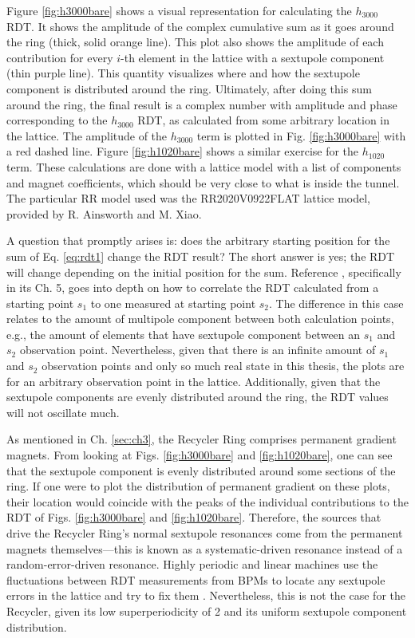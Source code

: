 Figure \ref{fig:h3000bare} shows a visual representation for calculating the $h_{3000}$ RDT. It shows the amplitude of the complex cumulative sum as it goes around the ring (thick, solid orange line). This plot also shows the amplitude of each contribution for every $i$-th element in the lattice with a sextupole component (thin purple line). This quantity visualizes where and how the sextupole component is distributed around the ring. Ultimately, after doing this sum around the ring, the final result is a complex number with amplitude and phase corresponding to the $h_{3000}$ RDT, as calculated from some arbitrary location in the lattice. The amplitude of the $h_{3000}$ term is plotted in Fig. \ref{fig:h3000bare} with a red dashed line. Figure \ref{fig:h1020bare} shows a similar exercise for the $h_{1020}$ term. These calculations are done with a lattice model with a list of components and magnet coefficients, which should be very close to what is inside the tunnel. The particular RR model used was the RR2020V0922FLAT lattice model, provided by R. Ainsworth and M. Xiao.

A question that promptly arises is: does the arbitrary starting position for the sum of Eq. \ref{eq:rdt1} change the RDT result? The short answer is yes; the RDT will change depending on the initial position for the sum. Reference \cite{cernthesis2}, specifically in its Ch. 5, goes into depth on how to correlate the RDT calculated from a starting point $s_1$ to one measured at starting point $s_2$. The difference in this case relates to the amount of multipole component between both calculation points, e.g., the amount of elements that have sextupole component between an $s_1$ and $s_2$ observation point. Nevertheless, given that there is an infinite amount of $s_1$ and $s_2$ observation points and only so much real state in this thesis, the plots are for an arbitrary observation point in the lattice. Additionally, given that the sextupole components are evenly distributed around the ring, the RDT values will not oscillate much.

As mentioned in Ch. \ref{sec:ch3}, the Recycler Ring comprises permanent gradient magnets. From looking at Figs. \ref{fig:h3000bare} and \ref{fig:h1020bare}, one can see that the sextupole component is evenly distributed around some sections of the ring. If one were to plot the distribution of permanent gradient on these plots, their location would coincide with the peaks of the individual contributions to the RDT of Figs. \ref{fig:h3000bare} and \ref{fig:h1020bare}. Therefore, the sources that drive the Recycler Ring's normal sextupole resonances come from the permanent magnets themselves---this is known as a systematic-driven resonance instead of a random-error-driven resonance. Highly periodic and linear machines use the fluctuations between RDT measurements from BPMs to locate any sextupole errors in the lattice and try to fix them \cite{cernthesis2}. Nevertheless, this is not the case for the Recycler, given its low superperiodicity of 2 and its uniform sextupole component distribution.

